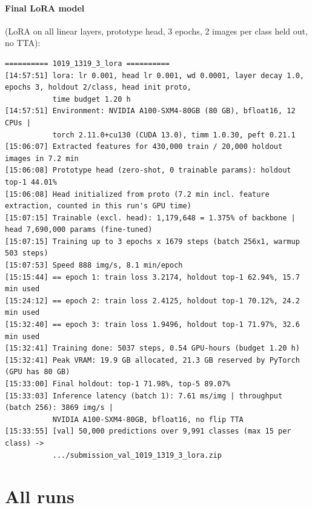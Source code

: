 \paragraph{Final LoRA model} (LoRA on all linear layers, prototype head, 3 epochs, 2 images per class held out, no TTA):
{\scriptsize
\begin{verbatim}
========== 1019_1319_3_lora ==========
[14:57:51] lora: lr 0.001, head lr 0.001, wd 0.0001, layer decay 1.0, epochs 3, holdout 2/class, head init proto,
           time budget 1.20 h
[14:57:51] Environment: NVIDIA A100-SXM4-80GB (80 GB), bfloat16, 12 CPUs |
           torch 2.11.0+cu130 (CUDA 13.0), timm 1.0.30, peft 0.21.1
[15:06:07] Extracted features for 430,000 train / 20,000 holdout images in 7.2 min
[15:06:08] Prototype head (zero-shot, 0 trainable params): holdout top-1 44.01%
[15:06:08] Head initialized from proto (7.2 min incl. feature extraction, counted in this run's GPU time)
[15:07:15] Trainable (excl. head): 1,179,648 = 1.375% of backbone | head 7,690,000 params (fine-tuned)
[15:07:15] Training up to 3 epochs x 1679 steps (batch 256x1, warmup 503 steps)
[15:07:53] Speed 888 img/s, 8.1 min/epoch
[15:15:44] == epoch 1: train loss 3.2174, holdout top-1 62.94%, 15.7 min used
[15:24:12] == epoch 2: train loss 2.4125, holdout top-1 70.12%, 24.2 min used
[15:32:40] == epoch 3: train loss 1.9496, holdout top-1 71.97%, 32.6 min used
[15:32:41] Training done: 5037 steps, 0.54 GPU-hours (budget 1.20 h)
[15:32:41] Peak VRAM: 19.9 GB allocated, 21.3 GB reserved by PyTorch (GPU has 80 GB)
[15:33:00] Final holdout: top-1 71.98%, top-5 89.07%
[15:33:03] Inference latency (batch 1): 7.61 ms/img | throughput (batch 256): 3869 img/s |
           NVIDIA A100-SXM4-80GB, bfloat16, no flip TTA
[15:33:55] [val] 50,000 predictions over 9,991 classes (max 15 per class) ->
           .../submission_val_1019_1319_3_lora.zip
\end{verbatim}
}

\clearpage %
\section{All runs}
\label{sec:all-runs}


